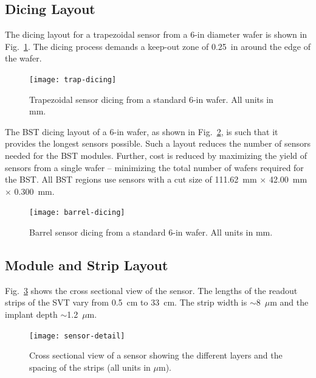 \subsection{Dicing Layout}

The dicing layout for a trapezoidal sensor from a 6-in diameter wafer is 
shown in Fig.~\ref{fig:trap-dicing}.  The dicing process demands a 
keep-out zone of 0.25~in around the edge of the wafer.

\begin{figure}[htbp]
\centering
\texttt{[image: trap-dicing]}
\caption{\small{Trapezoidal sensor dicing from a standard 6-in wafer. All 
units in mm.}}
\label{fig:trap-dicing}
\end{figure}


The BST dicing layout of a 6-in wafer, as shown in 
Fig.~\ref{fig:barrel-dicing}, is such that it provides the longest sensors 
possible.  Such a layout reduces the number of sensors needed for the BST 
modules.  Further, cost is reduced by maximizing the yield of sensors from a 
single wafer -- minimizing the total number of wafers required for the BST.  
All BST regions use sensors with a cut size of 111.62~mm $\times$ 42.00~mm 
$\times$ 0.300~mm.

\begin{figure}[htbp]
\centering
\texttt{[image: barrel-dicing]}
\caption{\small{Barrel sensor dicing from a standard 6-in wafer. All units 
in mm.}}
\label{fig:barrel-dicing}
\end{figure}

\subsection{Module and Strip Layout}

Fig.~\ref{fig:sensor-detail} shows the cross sectional view of the sensor.  
The lengths of the readout strips of the SVT vary from 0.5~cm to 33~cm.  The 
strip width is $\sim$8~$\mu$m and the implant depth $\sim$1.2~$\mu$m.

\begin{figure}[htbp]
\centering
\texttt{[image: sensor-detail]}
\caption{\small{Cross sectional view of a sensor showing the different
layers and the spacing of the strips (all units in $\mu$m).}}
\label{fig:sensor-detail}
\end{figure}

